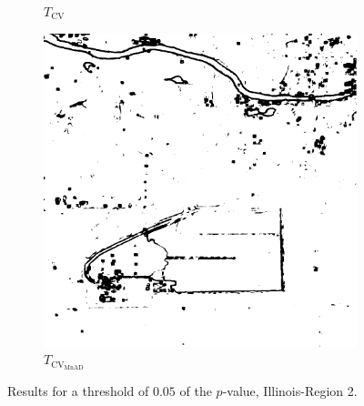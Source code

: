 \documentclass[aspectratio=1610,10pt]{beamer}
\begin{document}
\begin{frame}
\begin{figure}[H]
\begin{subfigure}[b]{0.3\textwidth}
    \caption{$T_\text{CV}$}
    \label{fig:Illinois_crops_0.05-2}
  \end{subfigure}
  \hfill
  \begin{subfigure}[b]{0.3\textwidth}
    \centering
    \includegraphics[width=\textwidth]{../../Figures/PNG/mnad_005_Illinois_crops_1024}
     \caption{$T_{\text{CV}_{\text{MnAD}}}$}
    \label{fig:Illinois_crops_0.05-3}
  \end{subfigure}
  \caption{Results for a threshold of $0.05$ of the $p$-value, Illinois-Region 2. }
  \label{fig:Illinois_crops_0.05}
\end{figure}
\end{frame} 




\end{document}

